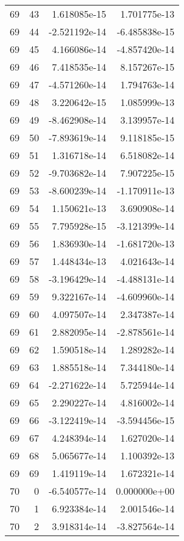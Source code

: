 \begin{tabular}{rrrr}
  69 &   43 &  1.618085e-15 &  1.701775e-13 \\
  69 &   44 & -2.521192e-14 & -6.485838e-15 \\
  69 &   45 &  4.166086e-14 & -4.857420e-14 \\
  69 &   46 &  7.418535e-14 &  8.157267e-15 \\
  69 &   47 & -4.571260e-14 &  1.794763e-14 \\
  69 &   48 &  3.220642e-15 &  1.085999e-13 \\
  69 &   49 & -8.462908e-14 &  3.139957e-14 \\
  69 &   50 & -7.893619e-14 &  9.118185e-15 \\
  69 &   51 &  1.316718e-14 &  6.518082e-14 \\
  69 &   52 & -9.703682e-14 &  7.907225e-15 \\
  69 &   53 & -8.600239e-14 & -1.170911e-13 \\
  69 &   54 &  1.150621e-13 &  3.690908e-14 \\
  69 &   55 &  7.795928e-15 & -3.121399e-14 \\
  69 &   56 &  1.836930e-14 & -1.681720e-13 \\
  69 &   57 &  1.448434e-13 &  4.021643e-14 \\
  69 &   58 & -3.196429e-14 & -4.488131e-14 \\
  69 &   59 &  9.322167e-14 & -4.609960e-14 \\
  69 &   60 &  4.097507e-14 &  2.347387e-14 \\
  69 &   61 &  2.882095e-14 & -2.878561e-14 \\
  69 &   62 &  1.590518e-14 &  1.289282e-14 \\
  69 &   63 &  1.885518e-14 &  7.344180e-14 \\
  69 &   64 & -2.271622e-14 &  5.725944e-14 \\
  69 &   65 &  2.290227e-14 &  4.816002e-14 \\
  69 &   66 & -3.122419e-14 & -3.594456e-15 \\
  69 &   67 &  4.248394e-14 &  1.627020e-14 \\
  69 &   68 &  5.065677e-14 &  1.100392e-13 \\
  69 &   69 &  1.419119e-14 &  1.672321e-14 \\
  70 &    0 & -6.540577e-14 &  0.000000e+00 \\
  70 &    1 &  6.923384e-14 &  2.001546e-14 \\
  70 &    2 &  3.918314e-14 & -3.827564e-14 \\

\end{tabular}
